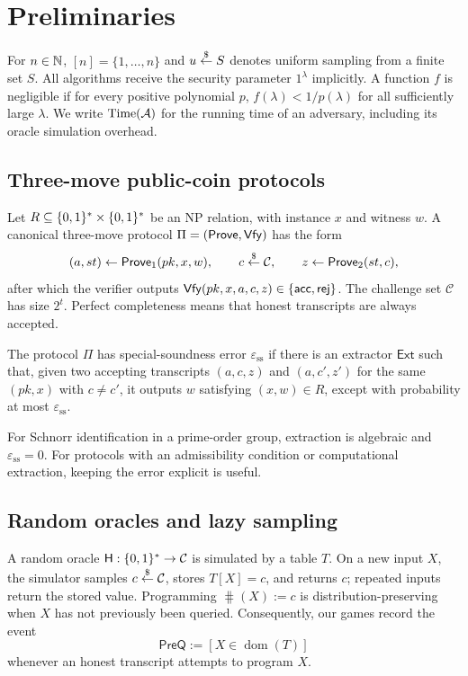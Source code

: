 \section{Preliminaries}
\label{sec:preliminaries}

For $n\in\mathbb{N}$, $[n]=\{1,\ldots,n\}$ and $u\mathrel{\mathop{\leftarrow}\limits^{\$}} S$ denotes uniform sampling
from a finite set $S$.  All algorithms receive the security parameter
$1^\lambda$ implicitly.  A function $f$ is negligible if for every positive
polynomial $p$, $f(\lambda)<1/p(\lambda)$ for all sufficiently large
$\lambda$.  We write $\operatorname{Time}(\mathcal{A})$ for the running time of an adversary,
including its oracle simulation overhead.

\subsection{Three-move public-coin protocols}

Let $R\subseteq\{0,1\}^*\times\{0,1\}^*$ be an NP relation, with instance $x$ and
witness $w$.  A canonical three-move protocol $\Pi=(\mathsf{Prove},\mathsf{Vfy})$ has the
form
\[
  (a,st)\leftarrow\mathsf{Prove}_1(pk,x,w),\qquad
  c\mathrel{\mathop{\leftarrow}\limits^{\$}}\mathcal{C},\qquad
  z\leftarrow\mathsf{Prove}_2(st,c),
\]
after which the verifier outputs $\mathsf{Vfy}(pk,x,a,c,z)\in\{\mathsf{acc},\mathsf{rej}\}$.
The challenge set $\mathcal{C}$ has size $2^t$.  Perfect completeness means
that honest transcripts are always accepted.

\begin{definition}
  \label{def:ss}
  The protocol $\Pi$ has special-soundness error $\varepsilon_{\mathrm{ss}}$
  if there is an extractor $\mathsf{Ext}$ such that, given two accepting
  transcripts $(a,c,z)$ and $(a,c',z')$ for the same $(pk,x)$ with $c\ne c'$,
  it outputs $w$ satisfying $(x,w)\in R$, except with probability at most
  $\varepsilon_{\mathrm{ss}}$.
\end{definition}

For Schnorr identification in a prime-order group, extraction is algebraic and
$\varepsilon_{\mathrm{ss}}=0$.  For protocols with an admissibility condition
or computational extraction, keeping the error explicit is useful.

\subsection{Random oracles and lazy sampling}

A random oracle $\mathsf{H}:\{0,1\}^*\to\mathcal{C}$ is simulated by a table $T$.
On a new input $X$, the simulator samples $c\mathrel{\mathop{\leftarrow}\limits^{\$}}\mathcal{C}$, stores
$T[X]=c$, and returns $c$; repeated inputs return the stored value.  Programming
$\hash(X):=c$ is distribution-preserving when $X$ has not previously been
queried.  Consequently, our games record the event
\[
  \mathsf{PreQ}:=[X\in\operatorname{dom}(T)]
\]
whenever an honest transcript attempts to program $X$.

